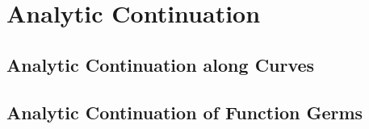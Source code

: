 \documentclass[../Moduli_Spaces_of_Riemann_Surfaces.tex]{subfiles}
\begin{document}
    \section{Analytic Continuation}\label{sec:analytic_continuation}
    \subsection{Analytic Continuation along Curves}
    \subsection{Analytic Continuation of Function Germs}
\end{document}
